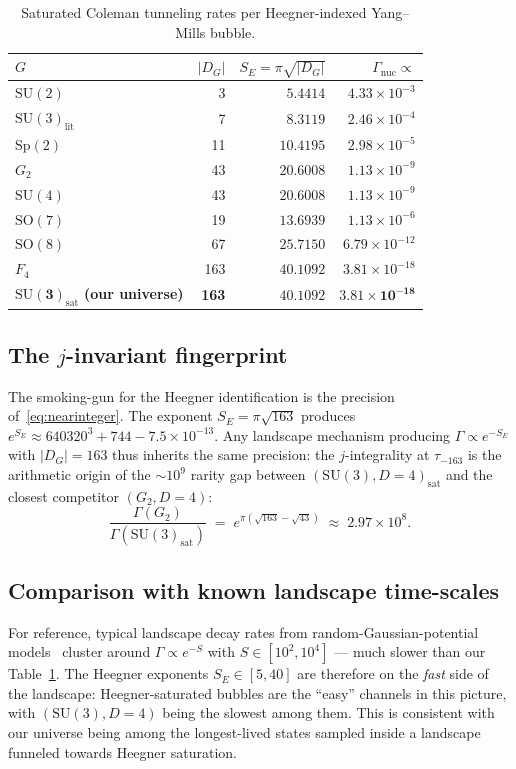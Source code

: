 \documentclass[11pt,a4paper]{article}
\theoremstyle{plain}
\theoremstyle{definition}
\newcommand{\SU}{\mathrm{SU}}
\newcommand{\SO}{\mathrm{SO}}
\newcommand{\Sp}{\mathrm{Sp}}
\newcommand{\sat}{\mathrm{sat}}
\newcommand{\nuc}{\mathrm{nuc}}
\newcommand{\lit}{\mathrm{lit}}
\begin{document}
\begin{table}[ht]
\centering
\begin{tabular}{lrrr}
\toprule
$G$ & $|D_G|$ & $S_E=\pi\sqrt{|D_G|}$ & $\Gamma_{\nuc}\propto$ \\
\midrule
$\SU(2)$ & 3 & $5.4414$ & $4.33\times 10^{-3}$ \\
$\SU(3)_{\lit}$ & 7 & $8.3119$ & $2.46\times 10^{-4}$ \\
$\Sp(2)$ & 11 & $10.4195$ & $2.98\times 10^{-5}$ \\
$G_2$ & 43 & $20.6008$ & $1.13\times 10^{-9}$ \\
$\SU(4)$ & 43 & $20.6008$ & $1.13\times 10^{-9}$ \\
$\SO(7)$ & 19 & $13.6939$ & $1.13\times 10^{-6}$ \\
$\SO(8)$ & 67 & $25.7150$ & $6.79\times 10^{-12}$ \\
$F_4$ & 163 & $40.1092$ & $3.81\times 10^{-18}$ \\
\midrule
$\boldsymbol{\SU(3)_{\sat}}$ \textbf{(our universe)} & \textbf{163} & $\boldsymbol{40.1092}$ & $\boldsymbol{3.81\times 10^{-18}}$ \\
\bottomrule
\end{tabular}
\caption{Saturated Coleman tunneling rates per Heegner-indexed Yang--Mills bubble.}
\label{tab:rates}
\end{table}

\subsection{The $j$-invariant fingerprint}

The smoking-gun for the Heegner identification is the precision of~\eqref{eq:nearinteger}. The exponent $S_E=\pi\sqrt{163}$ produces $e^{S_E}\approx 640320^3+744-7.5\times 10^{-13}$. Any landscape mechanism producing $\Gamma\propto e^{-S_E}$ with $|D_G|=163$ thus inherits the same precision: the $j$-integrality at $\tau_{-163}$ is the arithmetic origin of the $\sim 10^9$ rarity gap between $(\SU(3),D{=}4)_{\sat}$ and the closest competitor $(G_2,D{=}4)$:
\[
\frac{\Gamma(G_2)}{\Gamma(\SU(3)_{\sat})} \;=\; e^{\pi(\sqrt{163}-\sqrt{43})} \;\approx\; 2.97\times 10^{8}.
\]

\subsection{Comparison with known landscape time-scales}

For reference, typical landscape decay rates from random-Gaussian-potential models~\cite{AazamiEasther2006} cluster around $\Gamma\propto e^{-S}$ with $S\in[10^2,10^4]$ --- much slower than our Table~\ref{tab:rates}. The Heegner exponents $S_E\in[5,40]$ are therefore on the \emph{fast} side of the landscape: Heegner-saturated bubbles are the ``easy'' channels in this picture, with $(\SU(3),D{=}4)$ being the slowest among them. This is consistent with our universe being among the longest-lived states sampled inside a landscape funneled towards Heegner saturation.
\end{document}
